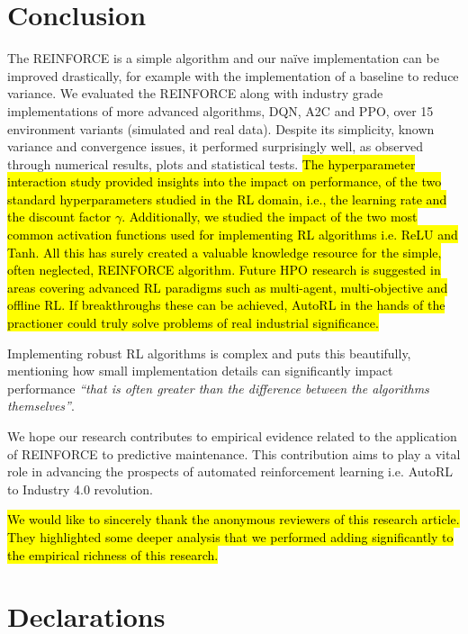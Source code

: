 \documentclass[referee, sn-mathphys-num]{sn-jnl}
\newcommand{\hlc}[2][cyan!15]{{\colorlet{foo}{#1}\sethlcolor{foo}\hl{#2}}}
\begin{document}
	\section{Conclusion}\label{sec_Conclusion}
	The REINFORCE is a simple algorithm and our na\"ive implementation can be improved drastically, for example with the implementation of a baseline to reduce variance. We evaluated the REINFORCE along with industry grade implementations of more advanced algorithms, DQN, A2C and PPO, over 15 environment variants (simulated and real data). Despite its simplicity, known variance and convergence issues, it performed surprisingly well, as observed through numerical results, plots and statistical tests. \hlc{The hyperparameter interaction study provided insights into the impact on performance, of the two standard hyperparameters studied in the RL domain, i.e., the learning rate and the discount factor $\gamma$. Additionally, we studied the impact of the two most common activation functions used for implementing RL algorithms i.e. ReLU and Tanh. All this has surely created a valuable knowledge resource for the simple, often neglected, REINFORCE algorithm. Future HPO research is suggested in areas covering advanced RL paradigms such as multi-agent, multi-objective and offline RL. If breakthroughs these can be achieved, AutoRL in the hands of the practioner could truly solve problems of real industrial significance.}
	
	Implementing robust RL algorithms is complex and \cite{SB3-paper} puts this beautifully, mentioning how small implementation details can significantly impact performance \textit{``that is often greater than the difference between the algorithms themselves''}. 
	
	We hope our research contributes to empirical evidence related to the application of REINFORCE to predictive maintenance. This contribution aims to play a vital role in advancing the prospects of automated reinforcement learning i.e. AutoRL to Industry 4.0 revolution.
	
	\backmatter
	
	
	\hlc{We would like to sincerely thank the anonymous reviewers of this research article. They highlighted some deeper analysis that we performed adding significantly to the empirical richness of this research.}
	
	\section*{Declarations}
	
\end{document}

